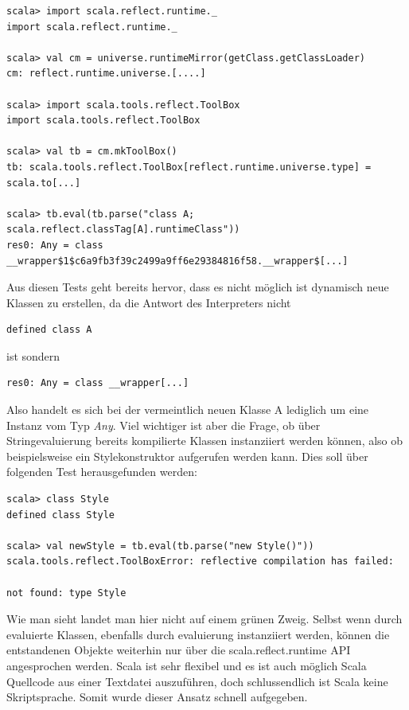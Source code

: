 \begin{lstlisting}[style=scala, caption={Auszug aus interaktivem Scala Interpreter zum Testen der möglichen Stringevaluierung}, label = {lst:evalrepl}]
scala> import scala.reflect.runtime._
import scala.reflect.runtime._

scala> val cm = universe.runtimeMirror(getClass.getClassLoader)
cm: reflect.runtime.universe.[....]

scala> import scala.tools.reflect.ToolBox
import scala.tools.reflect.ToolBox

scala> val tb = cm.mkToolBox()
tb: scala.tools.reflect.ToolBox[reflect.runtime.universe.type] = scala.to[...]

scala> tb.eval(tb.parse("class A; scala.reflect.classTag[A].runtimeClass"))
res0: Any = class __wrapper$1$c6a9fb3f39c2499a9ff6e29384816f58.__wrapper$[...]
\end{lstlisting}Aus diesen Tests geht bereits hervor, dass es nicht möglich ist dynamisch neue Klassen zu erstellen, da die Antwort des Interpreters nicht\begin{lstlisting}[style=scala, aboveskip=0pt]
defined class A
\end{lstlisting}ist sondern \begin{lstlisting}[style=scala, aboveskip=0pt]
res0: Any = class __wrapper[...]
\end{lstlisting}Also handelt es sich bei der vermeintlich neuen Klasse A lediglich um eine Instanz vom Typ \textit{Any}. Viel wichtiger ist aber die Frage, ob über Stringevaluierung bereits kompilierte Klassen instanziiert werden können, also ob beispielsweise ein Stylekonstruktor aufgerufen werden kann. Dies soll über folgenden Test herausgefunden werden:
\begin{lstlisting}[style=scala]
scala> class Style
defined class Style

scala> val newStyle = tb.eval(tb.parse("new Style()"))
scala.tools.reflect.ToolBoxError: reflective compilation has failed:

not found: type Style
\end{lstlisting}Wie man sieht landet man hier nicht auf einem grünen Zweig. Selbst wenn durch evaluierte Klassen, ebenfalls durch evaluierung instanziiert werden, können die entstandenen Objekte weiterhin nur über die scala.reflect.runtime API angesprochen werden.
Scala ist sehr flexibel und es ist auch möglich Scala Quellcode aus einer Textdatei auszuführen, doch schlussendlich ist Scala keine Skriptsprache. Somit wurde dieser Ansatz schnell aufgegeben.
